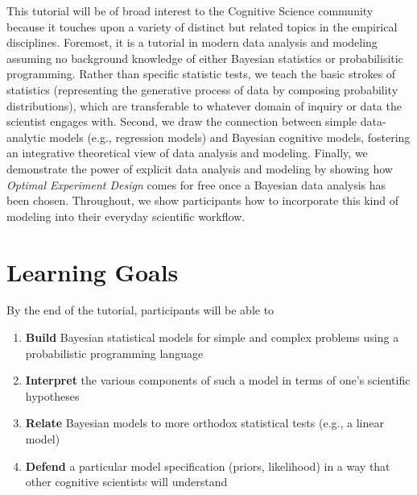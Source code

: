 \documentclass[10pt,letterpaper]{article}
\newcommand{\ndg}[1]{\textcolor{green}{[ndg: #1]}}
\providecommand{\tightlist}{%
  \setlength{\itemsep}{0pt}\setlength{\parskip}{0pt}}
\begin{document}



This tutorial will be of broad interest to the Cognitive Science community because it touches upon a variety of distinct but related topics in the empirical disciplines. 
Foremost, it is a tutorial in modern data analysis and modeling assuming no background knowledge of either Bayesian statistics or probabilisitic programming. 
Rather than specific statistic tests, we teach the basic strokes of statistics (representing the generative process of data by composing probability distributions), which are transferable to whatever domain of inquiry or data the scientist engages with. 
Second, we draw the connection between simple data-analytic models (e.g., regression models) and Bayesian cognitive models, fostering an integrative theoretical view of data analysis and modeling.
Finally, we demonstrate the power of explicit data analysis and modeling by showing how \emph{Optimal Experiment Design} comes for free once a Bayesian data analysis has been chosen.
Throughout, we show participants how to incorporate this kind of modeling into their everyday scientific workflow. 



\section{Learning Goals}

By the end of the tutorial, participants will be able to 

\begin{enumerate}
\tightlist
\item \textbf{Build} Bayesian statistical models for simple and complex problems using a probabilistic programming language 
\item \textbf{Interpret} the various components of such a model in terms of one's scientific hypotheses 
\item \textbf{Relate} Bayesian models to more orthodox statistical tests (e.g., a linear model) 
\item \textbf{Defend} a particular model specification (priors, likelihood) in a way that other cognitive scientists will understand
\end{enumerate}
\end{document}
